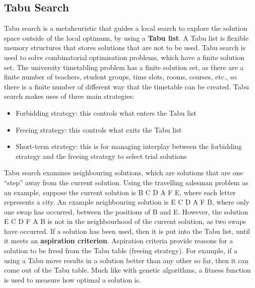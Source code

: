 \documentclass[a4paper, 12pt]{report}
\begin{document}
\subsection{Tabu Search}
Tabu search is a metaheuristic that guides a local search to explore the
solution space outside of the local optimum, by using a \textbf{Tabu list}. A
Tabu list is flexible memory structures that stores solutions that are not to
be used. Tabu search is used to solve combinatorial optimisation problems,
which have a finite solution set. The university timetabling problem has a
finite solution set, as there are a finite number of teachers, student groups,
time slots, rooms, courses, etc., so there is a finite number of different way
that the timetable can be created. Tabu search makes uses of three main
strategies:
\begin{itemize}
	\item Forbidding strategy: this controls what enters the Tabu list
	\item Freeing strategy: this controls what exits the Tabu list
	\item Short-term strategy: this is for managing interplay between the
	forbidding strategy and the freeing strategy to select trial solutions
\end{itemize}
Tabu search examines neighbouring solutions, which are solutions that are one
“step” away from the current solution. Using the travelling salesman problem as
an example, suppose the current solution is B C D A F E, where each letter
represents a city. An example neighbouring solution is E C D A F B, where only
one swap has occurred, between the positions of B and E. However, the solution
E C D F A B is not in the neighbourhood of the current solution, as two swaps
have occurred. If a solution has been used, then it is put into the Tabu list,
until it meets an \textbf{aspiration criterion}. Aspiration criteria provide
reasons for a solution to be freed from the Tabu table (freeing strategy). For
example, if a using a Tabu move results in a solution better than any other so
far, then it can come out of the Tabu table. Much like with genetic algorithms,
a fitness function is used to measure how optimal a solution is.
\end{document}
